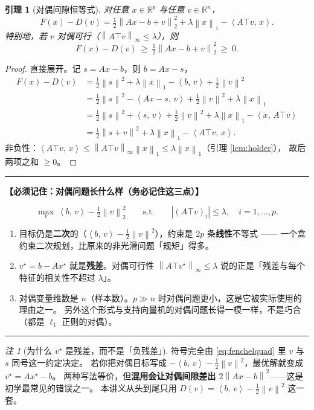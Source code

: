 \documentclass[11pt,a4paper,UTF8]{ctexart}
\theoremstyle{plain}
\newtheorem{lemma}[theorem]{引理}
\theoremstyle{definition}
\theoremstyle{remark}
\newtheorem{remark}[theorem]{注}
\newcommand{\R}{\mathbb{R}}
\newcommand{\norm}[1]{\left\lVert #1 \right\rVert}
\newcommand{\abs}[1]{\left\lvert #1 \right\rvert}
\newcommand{\inner}[2]{\left\langle #1,\, #2 \right\rangle}
\newenvironment{keypoint}[1]
  {\par\medskip\noindent\begin{minipage}{\linewidth}%
   \hrule\smallskip\noindent\textbf{【必须记住：#1】}\par\nopagebreak\smallskip}
  {\smallskip\hrule\end{minipage}\medskip}
\begin{document}
\begin{lemma}[对偶间隙恒等式]\label{lem:gap}
对任意 $x\in\R^p$ 与任意 $v\in\R^n$，
\begin{equation}
F(x)-D(v)=\tfrac12\norm{Ax-b+v}_2^2+\lambda\norm x_1-\inner{A\top v}{x}.
\label{eq:gapid}
\end{equation}
特别地，若 $v$ 对偶可行（$\norm{A\top v}_\infty\le\lambda$），则
\begin{equation}
F(x)-D(v)\ \ge\ \tfrac12\norm{Ax-b+v}_2^2\ \ge\ 0 .
\label{eq:gapnonneg}
\end{equation}
\end{lemma}

\begin{proof}
直接展开。记 $s=Ax-b$，则 $b=Ax-s$，
\begin{align*}
F(x)-D(v)
&=\tfrac12\norm s^2+\lambda\norm x_1-\inner b v+\tfrac12\norm v^2\\
&=\tfrac12\norm s^2-\inner{Ax-s}{v}+\tfrac12\norm v^2+\lambda\norm x_1\\
&=\tfrac12\norm s^2+\inner sv+\tfrac12\norm v^2+\lambda\norm x_1-\inner x{A\top v}\\
&=\tfrac12\norm{s+v}^2+\lambda\norm x_1-\inner{A\top v}{x}.
\end{align*}
非负性：$\inner{A\top v}{x}\le\norm{A\top v}_\infty\norm x_1\le\lambda\norm x_1$（引理 \ref{lem:holder}），
故后两项之和 $\ge0$。
\end{proof}

\begin{keypoint}{对偶问题长什么样（务必记住这三点）}
\[
\max_{v}\ \inner b v-\tfrac12\norm v_2^2
\qquad\text{s.t.}\qquad \abs{(A\top v)_i}\le\lambda,\quad i=1,\dots,p .
\]
\begin{enumerate}
\item 目标仍是\textbf{二次}的（$\inner bv-\tfrac12\norm v^2$），约束是 $2p$ 条\textbf{线性}不等式
      —— 一个盒约束二次规划，比原来的非光滑问题「规矩」得多。
\item $v^\star=b-Ax^\star$ 就是\textbf{残差}。对偶可行性
      $\norm{A\top v^\star}_\infty\le\lambda$ 说的正是「残差与每个特征的相关性不超过 $\lambda$」。
\item 对偶变量维数是 $n$（样本数）。$p\gg n$ 时对偶问题更小，这是它被实际使用的理由之一。
      另外这个形式与支持向量机的对偶问题长得一模一样，不是巧合（都是 $\ell_1$ 正则的对偶）。
\end{enumerate}
\end{keypoint}

\begin{remark}[为什么 $v^\star$ 是残差，而不是「负残差」]
符号完全由 \eqref{eq:fenchelquad} 里 $v$ 与 $s$ 同号这一约定决定。
若你把对偶目标写成 $-\inner bv-\tfrac12\norm v^2$，最优解就变成 $v^\star=Ax^\star-b$。
两种写法等价，但\textbf{混用会让对偶间隙差出 $2\norm{Ax-b}^2$}——这是初学最常见的错误之一。
本讲义从头到尾只用 $D(v)=\inner bv-\tfrac12\norm v^2$ 这一套。
\end{remark}
\end{document}
